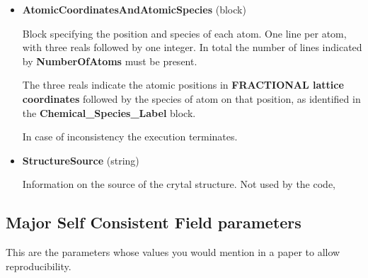 \documentclass[11pt]{article}
\begin{document}
\begin{itemize}
\item{\bf AtomicCoordinatesAndAtomicSpecies} (block)

  Block specifying the position and species of each atom.  One line
  per atom, with three reals followed by one integer.
  In total the number of lines indicated by {\bf NumberOfAtoms}
  must be present.

  The three reals indicate the atomic positions in
  {\bf FRACTIONAL lattice coordinates} followed by the
  species of atom on that position,
  as identified in the {\bf Chemical\_Species\_Label} block.

  In case of inconsistency the execution terminates.

\item{\bf StructureSource} (string)

  Information on the source of the crytal structure.
  Not used by the code,


\end{itemize}



\subsection{Major Self Consistent Field parameters}

This are the parameters whose values you would mention in a paper to allow reproducibility.
\end{document}
